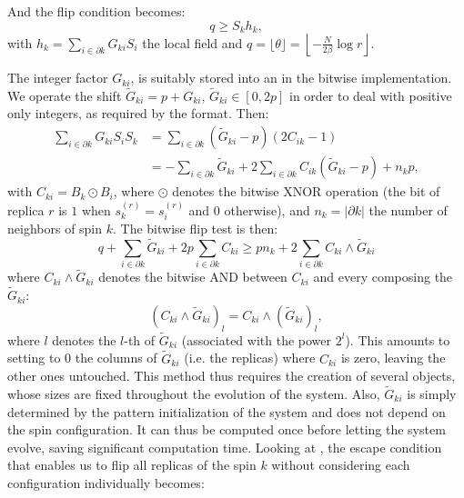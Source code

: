 And the flip condition becomes:
\begin{equation}
 q \geq S_k h_k,
  \label{eq:flip_condition_hopfield}
\end{equation}
with $h_k =  \sum_{i \in \partial k }G_{ki}S_i$ the local field and $q = \lfloor \theta \rfloor = \left\lfloor -\frac{N}{2\beta} \log r \right\rfloor$.

The integer factor $G_{ki}$, is suitably stored into an \UnsignedInt in the bitwise implementation.
We operate the shift $\tilde{G}_{ki} = p + G_{ki}$, $\tilde{G}_{ki} \in [0, 2p]$ in order to deal with positive only integers, as required by the \UnsignedInt format. Then:
\begin{align*}
    \sum_{i \in \partial k} G_{ki} S_i S_k &= \sum_{i \in \partial k}(\tilde{G}_{ki}-p)(2C_{ik}-1)\\
    &= -\sum_{i \in \partial k} \tilde{G}_{ki} + 2\sum_{i \in \partial k}
     C_{ik}(\tilde{G}_{ki}-p) + n_k p,
\end{align*}
with $C_{ki}= B_k \odot B_i$, where $\odot$ denotes the bitwise XNOR operation (the bit of replica $r$ is $1$ when $s_k^{(r)}=s_i^{(r)}$ and $0$ otherwise), and $n_k = |\partial k|$ the number of neighbors of spin $k$.
The bitwise flip test is then:
\begin{equation}
   q+ \sum_{i \in \partial k} \tilde{G}_{ki} + 2p\sum_{i \in \partial k} C_{ki} \geq  pn_k+
    2\sum_{i \in \partial k} C_{ki} \wedge \tilde{G}_{ki}
    \label{eq:flip_condition_hopfield_bitwise}
\end{equation}
where $C_{ki} \wedge \tilde{G}_{ki}$ denotes the bitwise AND between $C_{ki}$ and every \Bits composing the \UnsignedInt $\tilde{G}_{ki}$:
\begin{equation*}
  \left(C_{ki} \wedge \tilde{G}_{ki}\right)_l = C_{ki} \wedge \left(\tilde{G}_{ki}\right)_l,
\end{equation*}
where $l$ denotes the $l$-th \Bits of $\tilde{G}_{ki}$ (associated with the power $2^l$).
This amounts to setting to 0 the columns of $\tilde{G}_{ki}$ (i.e. the replicas) where $C_{ki}$ is zero, leaving the other ones untouched.
This method thus requires the creation of several \UnsignedInt objects, whose sizes are fixed throughout the evolution of the system.
Also, $\tilde{G}_{ki}$ is simply determined by the pattern initialization of the system and does not depend on the spin configuration.
It can thus be computed once before letting the system evolve, saving significant computation time. Looking at ,
the escape condition that enables us to flip all replicas of the spin $k$ without considering each configuration individually becomes:

